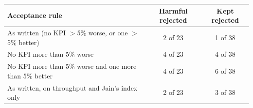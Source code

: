 \begin{tabular}{|>{\raggedright\arraybackslash}p{3.6cm}|c|c|}
\hline
Acceptance rule & Harmful rejected & Kept rejected \\
\hline
As written (no KPI $>$5\% worse, or one $>$5\% better) & 2 of 23 & 1 of 38 \\
\hline
No KPI more than 5\% worse & 4 of 23 & 4 of 38 \\
\hline
No KPI more than 5\% worse and one more than 5\% better & 4 of 23 & 6 of 38 \\
\hline
As written, on throughput and Jain's index only & 2 of 23 & 3 of 38 \\
\hline
\end{tabular}

